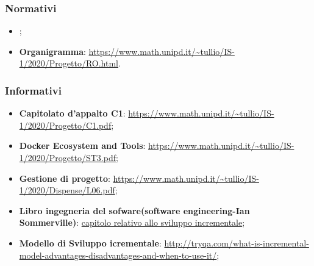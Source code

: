 \subsubsection{Normativi}
\begin{itemize}
    \item \NdPv{};
    \item \textbf{Organigramma}: \url{https://www.math.unipd.it/~tullio/IS-1/2020/Progetto/RO.html}.
\end{itemize}

\subsubsection{Informativi}
\begin{itemize}
    \item \textbf{Capitolato d'appalto C1}: \url{https://www.math.unipd.it/~tullio/IS-1/2020/Progetto/C1.pdf};
    \item \textbf{Docker Ecosystem and Tools}: \url{https://www.math.unipd.it/~tullio/IS-1/2020/Progetto/ST3.pdf};
    \item \textbf{Gestione di progetto}: \url{https://www.math.unipd.it/~tullio/IS-1/2020/Dispense/L06.pdf};
    \item \textbf{Libro ingegneria del sofware(software engineering-Ian Sommerville)}: \url{capitolo relativo allo sviluppo incrementale};
    \item \textbf{Modello di Sviluppo icrementale}: \url{http://tryqa.com/what-is-incremental-model-advantages-disadvantages-and-when-to-use-it/};
\end{itemize}

